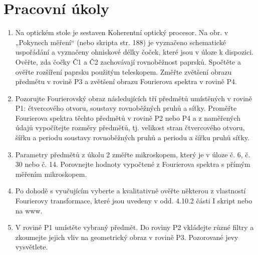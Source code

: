 \documentclass[a4paper]{article}
\author{Vladislav Wohlrath}
\begin{document}
\begin{titlepage}

\end{titlepage}

\section*{Pracovní úkoly}
\begin{enumerate}
\item Na optickém stole je sestaven Koherentní optický procesor. Na obr. v „Pokynech měření“ (nebo skripta str. 188) je vyznačeno schematické uspořádání a vyznačeny ohniskové délky čoček, které jsou v úloze k dispozici. Ověřte, zda čočky Č1 a Č2 zachovávají rovnoběžnost paprsků. Spočtěte a ověřte rozšíření paprsku použitým teleskopem. Změřte zvětšení obrazu předmětu v rovině P3 a zvětšení obrazu Fourierova spektra v rovině P4.
\item Pozorujte Fourierovský obraz následujících tří předmětů umístěných v rovině P1: čtvercového otvoru, soustavy rovnoběžných pruhů a síťky. Proměřte Fourierova spektra těchto předmětů v rovině P2 nebo P4 a z naměřených údajů vypočítejte rozměry předmětů, tj. velikost stran čtvercového otvoru, šířku a periodu soustavy rovnoběžných pruhů a periodu a šířku pruhů síťky.
\item Parametry předmětů z úkolu 2 změřte mikroskopem, který je v úloze č. 6, č. 30 nebo č. 14. Porovnejte hodnoty vypočtené z Fourierova spektra s přímým měřením mikroskopem.
\item Po dohodě s vyučujícím vyberte a kvalitativně ověřte některou z vlastností Fourierovy transformace, které jsou uvedeny v odd. 4.10.2 části I skript nebo na www.
\item V rovině P1 umístěte vybraný předmět. Do roviny P2 vkládejte různé filtry a zkoumejte jejich vliv na geometrický obraz v rovině P3. Pozorované jevy vysvětlete.

\end{enumerate}










\printbibliography[title={Seznam použité literatury}]
\end{document}
